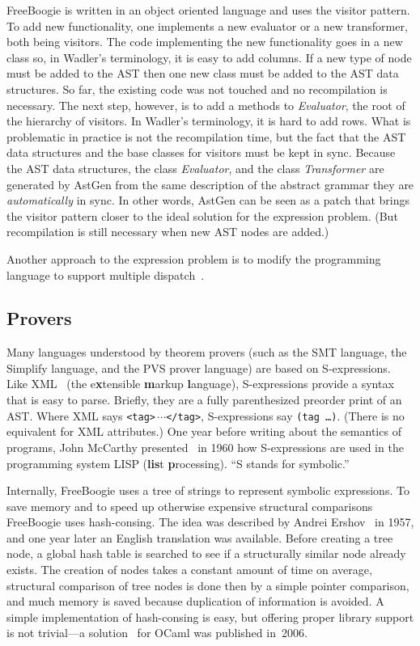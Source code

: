 \documentclass[a4paper]{article}
\def\fb#1{{\bf #1}} %
\theoremstyle{slanted}
\theoremstyle{definition}
\theoremstyle{remark}
\begin{document}
FreeBoogie is written in an object oriented language and uses
the visitor pattern. To add new functionality, one implements a
new evaluator or a new transformer, both being visitors. The
code implementing the new functionality goes in a new class so,
in Wadler's terminology, it is easy to add columns. If a new
type of node must be added to the AST then one new class must
be added to the AST data structures. So far, the existing code
was not touched and no recompilation is necessary. The next
step, however, is to add a methods to \textit{Evaluator}, the
root of the hierarchy of visitors. In Wadler's terminology, it
is hard to add rows. What is problematic in practice is not the
recompilation time, but the fact that the AST data structures
and the base classes for visitors must be kept in sync. Because
the AST data structures, the class \textit{Evaluator}, and the
class \textit{Transformer} are generated by AstGen from the same
description of the abstract grammar they are \emph{automatically}
in sync. In other words, AstGen can be seen as a patch that
brings the visitor pattern closer to the ideal solution for the
expression problem. (But recompilation is still necessary when
new AST nodes are added.)

Another approach to the expression problem is to
modify the programming language to support multiple
dispatch~\cite{chambers1994mm, clifton2006}.

\subsection{Provers}

Many languages understood by theorem provers (such as the SMT
language, the Simplify language, and the PVS prover language)
are based on S-expressions. Like XML~\cite{bray2006xml} (the
e\textbf{x}tensible \fb markup \fb language), S-expressions
provide a syntax that is easy to parse. Briefly, they are a fully
parenthesized preorder print of an AST\null. Where XML says
\texttt{<tag>$\,\cdots$</tag>}, S-expressions say \texttt{(tag
\dots)}. (There is no equivalent for XML attributes.) One year
before writing about the semantics of programs, John McCarthy
presented~\cite{mccarthy1960} in 1960 how S-expressions are used
in the programming system LISP (\textbf{lis}t \fb processing).
``S stands for symbolic.''

Internally, FreeBoogie uses a tree of strings to represent
symbolic expressions. To save memory and to speed up otherwise
expensive structural comparisons FreeBoogie uses hash-consing.
The idea was described by Andrei Ershov~\cite{ershov1958} in
1957, and one year later an English translation was available.
Before creating a tree node, a global hash table is searched to
see if a structurally similar node already exists. The creation
of nodes takes a constant amount of time on average, structural
comparison of tree nodes is done then by a simple pointer
comparison, and much memory is saved because duplication of
information is avoided. A simple implementation of hash-consing
is easy, but offering proper library support is not trivial---a
solution~\cite{filliatre2006hash} for OCaml was published
in~2006.
\end{document}

